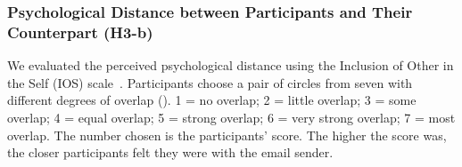 
\subsubsection{Psychological Distance between Participants and Their Counterpart (H3-b)}

We evaluated the perceived psychological distance using the Inclusion of Other in the Self (IOS) scale~\cite{aron1992inclusion}.
Participants choose a pair of circles from seven with different degrees of overlap (). 
1 = no overlap; 2 = little overlap; 3 = some overlap; 4 = equal overlap; 5 = strong overlap; 6 = very strong overlap; 7 = most overlap. 
The number chosen is the participants’ score.
The higher the score was, the closer participants felt they were with the email sender.